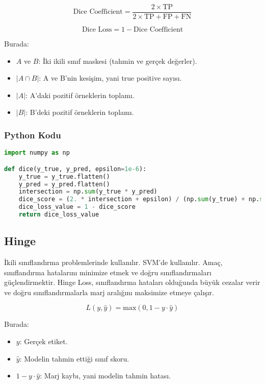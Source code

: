 \[ \text{Dice Coefficient} = \frac{2 \times \text{TP}}{2 \times \text{TP} + \text{FP} + \text{FN}} \]

\[ \text{Dice Loss} = 1 - \text{Dice Coefficient} \]

Burada:

\begin{itemize}
    \item $A$ ve $B$: İki ikili sınıf maskesi (tahmin ve gerçek değerler).
    \item $| A \cap B |$: A ve B'nin kesişim, yani true positive sayısı.
    \item $|A|$: A'daki pozitif örneklerin toplamı.
    \item $|B|$: B'deki pozitif örneklerin toplamı.
\end{itemize}

\subsubsection{Python Kodu}

\begin{lstlisting}[language=Python]
import numpy as np

def dice(y_true, y_pred, epsilon=1e-6):
    y_true = y_true.flatten()
    y_pred = y_pred.flatten()
    intersection = np.sum(y_true * y_pred)
    dice_score = (2. * intersection + epsilon) / (np.sum(y_true) + np.sum(y_pred) + epsilon)
    dice_loss_value = 1 - dice_score
    return dice_loss_value
\end{lstlisting}

\newpage

\subsection{Hinge}

İkili sınıflandırma problemlerinde kullanılır. SVM'de kullanılır.  Amaç, sınıflandırma hatalarını minimize etmek ve doğru sınıflandırmaları güçlendirmektir. Hinge Loss, sınıflandırma hataları olduğunda büyük cezalar verir ve doğru sınıflandırmalarla marj aralığını maksimize etmeye çalışır.

\[ L(y, \hat{y}) = \text{max}(0, 1 - y \cdot \hat{y}) \]

Burada:

\begin{itemize}
    \item $y$: Gerçek etiket.
    \item $\hat{y}$: Modelin tahmin ettiği sınıf skoru.
    \item $1 - y \cdot \hat{y}$: Marj kaybı, yani modelin tahmin hatası.
\end{itemize}

